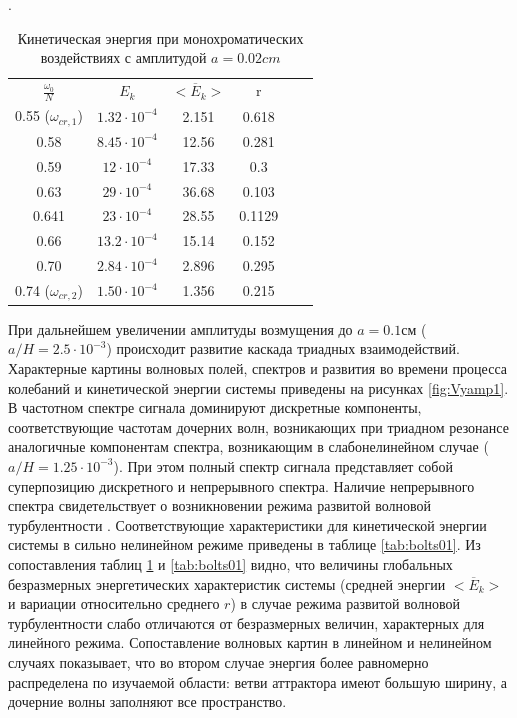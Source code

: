 \begin{table}
	\caption{ Кинетическая энергия при монохроматических воздействиях с амплитудой $a=0.02 cm$}. 
	\begin{center}
		\begin{tabular}{|c|c|c|c|c|c|}
			\hline
			$\displaystyle \frac{\omega_0}{N}$ & $E_k $ &  $<\overline{E}_{k}>$ & r\\
			0.55 ($\omega_{cr,1}$) & $1.32 \cdot 10^{-4}   $& 2.151    & 0.618     \\
			0.58                   & $8.45 \cdot 10^{-4}   $& 12.56    & 0.281     \\
			0.59                   & $ 12  \cdot 10^{-4}   $& 17.33    & 0.3       \\
			0.63                   & $29   \cdot 10^{-4}   $& 36.68    & 0.103     \\
			0.641                  & $23   \cdot 10^{-4}   $& 28.55    & 0.1129    \\
			0.66                   & $13.2 \cdot 10^{-4}   $& 15.14    & 0.152     \\
			0.70                   & $2.84 \cdot 10^{-4}   $& 2.896    & 0.295     \\
			0.74 ($\omega_{cr,2}$) & $1.50 \cdot 10^{-4}   $& 1.356    & 0.215     \\
			\hline
		\end{tabular}
	\end{center}
	\label{tab:bolts002}
\end{table}

При дальнейшем увеличении амплитуды возмущения до $a=0.1$см ($a/H=2.5\cdot 10^{-3}$) происходит развитие каскада триадных взаимодействий. Характерные картины волновых полей, спектров и развития во времени процесса колебаний и кинетической энергии системы приведены на рисунках \ref{fig:Vyamp1}. В частотном спектре сигнала доминируют дискретные компоненты, соответствующие частотам дочерних волн, возникающих при триадном резонансе аналогичные компонентам спектра, возникающим в слабонелинейном случае ($a/H=1.25\cdot 10^{-3}$). При этом полный спектр сигнала представляет собой суперпозицию дискретного и непрерывного спектра. Наличие непрерывного спектра свидетельствует о возникновении режима развитой волновой турбулентности \cite{Brouzet2016,Brouzetetal2017}. Соответствующие характеристики для кинетической энергии системы в сильно нелинейном режиме приведены в таблице \ref{tab:bolts01}. Из сопоставления таблиц \ref{tab:bolts002} и \ref{tab:bolts01} видно, что величины глобальных безразмерных энергетических характеристик системы (средней энергии  $<\overline{E}_{k}>$ и вариации относительно среднего $r$) в случае режима развитой волновой турбулентности слабо отличаются от безразмерных величин, характерных для линейного режима. Сопоставление волновых картин в линейном и нелинейном случаях показывает, что во втором случае энергия более равномерно распределена по изучаемой области: ветви аттрактора имеют большую ширину, а дочерние волны заполняют все пространство.

